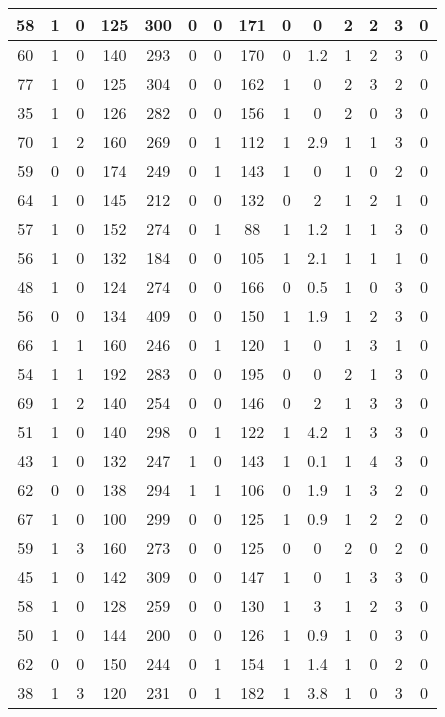 \documentclass{article}
\begin{document}
\begin{longtable}{|c|c|c|c|c|c|c|c|c|c|c|c|c|c|}
58 & 1 & 0 & 125 & 300 & 0 & 0 & 171 & 0 & 0 & 2 & 2 & 3 & 0\\ \hline
60 & 1 & 0 & 140 & 293 & 0 & 0 & 170 & 0 & 1.2 & 1 & 2 & 3 & 0\\ \hline
77 & 1 & 0 & 125 & 304 & 0 & 0 & 162 & 1 & 0 & 2 & 3 & 2 & 0\\ \hline
35 & 1 & 0 & 126 & 282 & 0 & 0 & 156 & 1 & 0 & 2 & 0 & 3 & 0\\ \hline
70 & 1 & 2 & 160 & 269 & 0 & 1 & 112 & 1 & 2.9 & 1 & 1 & 3 & 0\\ \hline
59 & 0 & 0 & 174 & 249 & 0 & 1 & 143 & 1 & 0 & 1 & 0 & 2 & 0\\ \hline
64 & 1 & 0 & 145 & 212 & 0 & 0 & 132 & 0 & 2 & 1 & 2 & 1 & 0\\ \hline
57 & 1 & 0 & 152 & 274 & 0 & 1 & 88 & 1 & 1.2 & 1 & 1 & 3 & 0\\ \hline
56 & 1 & 0 & 132 & 184 & 0 & 0 & 105 & 1 & 2.1 & 1 & 1 & 1 & 0\\ \hline
48 & 1 & 0 & 124 & 274 & 0 & 0 & 166 & 0 & 0.5 & 1 & 0 & 3 & 0\\ \hline
56 & 0 & 0 & 134 & 409 & 0 & 0 & 150 & 1 & 1.9 & 1 & 2 & 3 & 0\\ \hline
66 & 1 & 1 & 160 & 246 & 0 & 1 & 120 & 1 & 0 & 1 & 3 & 1 & 0\\ \hline
54 & 1 & 1 & 192 & 283 & 0 & 0 & 195 & 0 & 0 & 2 & 1 & 3 & 0\\ \hline
69 & 1 & 2 & 140 & 254 & 0 & 0 & 146 & 0 & 2 & 1 & 3 & 3 & 0\\ \hline
51 & 1 & 0 & 140 & 298 & 0 & 1 & 122 & 1 & 4.2 & 1 & 3 & 3 & 0\\ \hline
43 & 1 & 0 & 132 & 247 & 1 & 0 & 143 & 1 & 0.1 & 1 & 4 & 3 & 0\\ \hline
62 & 0 & 0 & 138 & 294 & 1 & 1 & 106 & 0 & 1.9 & 1 & 3 & 2 & 0\\ \hline
67 & 1 & 0 & 100 & 299 & 0 & 0 & 125 & 1 & 0.9 & 1 & 2 & 2 & 0\\ \hline
59 & 1 & 3 & 160 & 273 & 0 & 0 & 125 & 0 & 0 & 2 & 0 & 2 & 0\\ \hline
45 & 1 & 0 & 142 & 309 & 0 & 0 & 147 & 1 & 0 & 1 & 3 & 3 & 0\\ \hline
58 & 1 & 0 & 128 & 259 & 0 & 0 & 130 & 1 & 3 & 1 & 2 & 3 & 0\\ \hline
50 & 1 & 0 & 144 & 200 & 0 & 0 & 126 & 1 & 0.9 & 1 & 0 & 3 & 0\\ \hline
62 & 0 & 0 & 150 & 244 & 0 & 1 & 154 & 1 & 1.4 & 1 & 0 & 2 & 0\\ \hline
38 & 1 & 3 & 120 & 231 & 0 & 1 & 182 & 1 & 3.8 & 1 & 0 & 3 & 0\\ \hline

\end{longtable}
\end{document}
